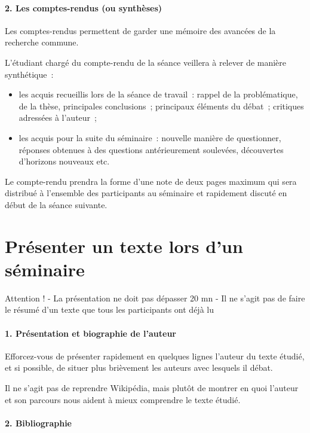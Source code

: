 \paragraph{2. Les comptes-rendus (ou synthèses)}

Les comptes-rendus permettent de garder une mémoire des avancées de la
recherche commune.

L'étudiant chargé du compte-rendu de la séance veillera à relever de
manière synthétique~:

\begin{itemize}
\item
  les acquis recueillis lors de la séance de travail~: rappel de la
  problématique, de la thèse, principales conclusions~; principaux
  éléments du débat~; critiques adressées à l'auteur~;
\item
  les acquis pour la suite du séminaire~: nouvelle manière de
  questionner, réponses obtenues à des questions antérieurement
  soulevées, découvertes d'horizons nouveaux etc.
\end{itemize}

Le compte-rendu prendra la forme d'une note de deux pages maximum qui
sera distribué à l'ensemble des participants au séminaire et rapidement
discuté en début de la séance suivante.


\section{Présenter un texte lors d’un séminaire}



Attention !
-	La présentation ne doit pas dépasser 20 mn
-	Il ne s’agit pas de faire le résumé d’un texte que tous les participants ont déjà lu

\paragraph{1.	Présentation et biographie de l’auteur 
}
Efforcez-vous de présenter rapidement en quelques lignes l’auteur du texte étudié, et si possible, de situer plus brièvement les auteurs avec lesquels il débat.

Il ne s’agit pas de reprendre Wikipédia, mais plutôt de montrer en quoi l’auteur et son parcours nous aident à mieux comprendre le texte étudié.

\paragraph{2.	Bibliographie}

